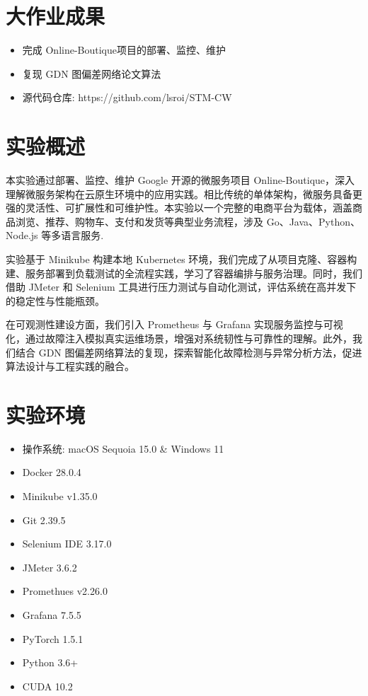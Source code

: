 \documentclass[hyperref,a4paper,UTF8]{ctexart}
\begin{document}
\section{大作业成果}
\begin{itemize}
    \item 完成 Online-Boutique项目的部署、监控、维护
    \item 复现 GDN 图偏差网络论文算法
    \item 源代码仓库: https://github.com/lsroi/STM-CW
\end{itemize}

\section{实验概述}
本实验通过部署、监控、维护 Google 开源的微服务项目 Online-Boutique，深入理解微服务架构在云原生环境中的应用实践。相比传统的单体架构，微服务具备更强的灵活性、可扩展性和可维护性。本实验以一个完整的电商平台为载体，涵盖商品浏览、推荐、购物车、支付和发货等典型业务流程，涉及 Go、Java、Python、Node.js 等多语言服务.

实验基于 Minikube 构建本地 Kubernetes 环境，我们完成了从项目克隆、容器构建、服务部署到负载测试的全流程实践，学习了容器编排与服务治理。同时，我们借助 JMeter 和 Selenium 工具进行压力测试与自动化测试，评估系统在高并发下的稳定性与性能瓶颈。

在可观测性建设方面，我们引入 Prometheus 与 Grafana 实现服务监控与可视化，通过故障注入模拟真实运维场景，增强对系统韧性与可靠性的理解。此外，我们结合 GDN 图偏差网络算法的复现，探索智能化故障检测与异常分析方法，促进算法设计与工程实践的融合。


\section{实验环境}
\begin{itemize}
    \item 操作系统: macOS Sequoia 15.0 \& Windows 11
    \item Docker 28.0.4
    \item Minikube v1.35.0
    \item Git 2.39.5
    \item Selenium IDE 3.17.0
    \item JMeter 3.6.2
    \item Promethues v2.26.0
    \item Grafana 7.5.5
    \item PyTorch 1.5.1
    \item Python 3.6+
    \item CUDA 10.2
\end{itemize}
\end{document}
